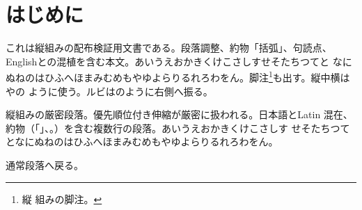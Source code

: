 \documentclass[pdflatex,tate]{jlreq}
\begin{document}
\section{はじめに}
これは縦組みの配布検証用文書である。段落調整、約物「括弧」、句読点、
Englishとの混植を含む本文。あいうえおかきくけこさしすせそたちつてと
なにぬねのはひふへほまみむめもやゆよらりるれろわをん。脚注\footnote{縦
組みの脚注。}も出す。縦中横はやの
ように使う。ルビはのように右側へ振る。
\begin{ptjparagraph}
縦組みの厳密段落。優先順位付き伸縮が厳密に扱われる。日本語とLatin
混在、約物（「」、。）を含む複数行の段落。あいうえおかきくけこさしす
せそたちつてとなにぬねのはひふへほまみむめもやゆよらりるれろわをん。
\end{ptjparagraph}
通常段落へ戻る。
\end{document}
